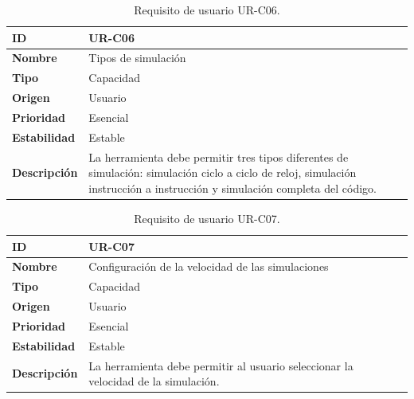 \begin{center}
\begin{table}[htbp]
\centering
\caption{Requisito de usuario UR-C06.}
\begin{tabular}{@{}p{2.5cm} p{9cm}@{}} 
\toprule
\textbf{ID} 				& UR-C06 \\
\midrule
\textbf{Nombre} 			& Tipos de simulación \\
\midrule
\textbf{Tipo} 			& Capacidad \\
\midrule
\textbf{Origen} 			& Usuario \\
\midrule
\textbf{Prioridad}		& Esencial \\
\midrule
\textbf{Estabilidad} 		& Estable \\
\midrule
\textbf{Descripción} 	& La herramienta debe permitir tres tipos diferentes de simulación: simulación ciclo a ciclo de reloj, simulación instrucción a instrucción y simulación completa del código.\\
\bottomrule
\end{tabular}
\label{tab:urc06}
\end{table}
\end{center}

\begin{center}
\begin{table}[htbp]
\centering
\caption{Requisito de usuario UR-C07.}
\begin{tabular}{@{}p{2.5cm} p{9cm}@{}} 
\toprule
\textbf{ID} 				& UR-C07 \\
\midrule
\textbf{Nombre} 			& Configuración de la velocidad de las simulaciones \\
\midrule
\textbf{Tipo} 			& Capacidad \\
\midrule
\textbf{Origen} 			& Usuario \\
\midrule
\textbf{Prioridad}		& Esencial \\
\midrule
\textbf{Estabilidad} 		& Estable \\
\midrule
\textbf{Descripción} 	& La herramienta debe permitir al usuario seleccionar la velocidad de la simulación. \\
\bottomrule
\end{tabular}
\label{tab:urc07}
\end{table}
\end{center}

